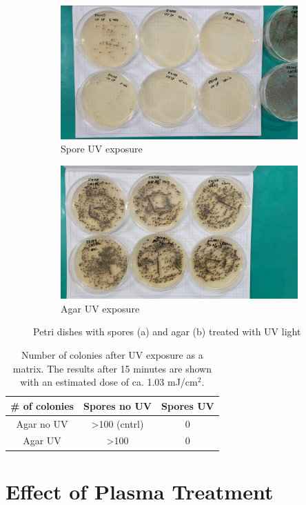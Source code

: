 \begin{figure}
    \centering
    \begin{subfigure}[b]{0.8\textwidth}
        \centering
        \includegraphics[width=\textwidth]{images/UV_SP.jpeg}
        \caption{Spore UV exposure}
        \label{fig:uv_a}
    \end{subfigure}
    \vfill
    \begin{subfigure}[b]{.8\textwidth}
        \centering
        \includegraphics[width=\textwidth]{images/UV_AG.jpeg}
        \caption{Agar UV exposure}
        \label{fig:uv_b}
    \end{subfigure}
    \caption[Photograph of Petri dishes after treatment]{Petri dishes with spores (a) and agar (b) treated with UV light}
    \label{fig:uv_experiment}
\end{figure}

\begin{table}
    \centering
    \caption[Number of colonies after UV exposure as a matrix]{Number of colonies after UV exposure as a matrix. The results after 15 minutes are shown with an estimated dose of ca. 1.03 mJ/cm$^2$.}
    \vspace*{1em}
    \renewcommand{\arraystretch}{1.4}
    \setlength{\tabcolsep}{12pt}
    \begin{tabular}{c|cc}
        {\# of colonies} & {Spores no UV} & {Spores UV} \\
        \hline
        Agar no UV & >100 (cntrl) & 0 \\
        Agar UV    & >100 & 0 \\
    \end{tabular}
    \label{tab:uv_matrix}
\end{table}


\section{Effect of Plasma Treatment}
